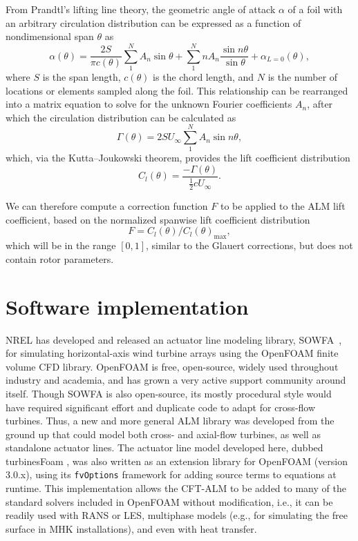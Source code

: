 \documentclass[times]{weauth}
\begin{document}
From Prandtl's lifting line theory, the geometric angle of attack $\alpha$ of a
foil with an arbitrary circulation distribution can be expressed as a function
of nondimensional span $\theta$ as \cite{Anderson2001}
\begin{equation}
    \alpha (\theta) = \frac{2S}{\pi c (\theta)}
    \sum_1^N A_n \sin \theta
    + \sum_1^N n A_n \frac{\sin n \theta}{\sin \theta}
    + \alpha_{L = 0}(\theta),
    \label{eq:lifting-line}
\end{equation}
where $S$ is the span length, $c(\theta)$ is the chord length, and $N$ is the
number of locations or elements sampled along the foil. This relationship can be
rearranged into a matrix equation to solve for the unknown Fourier coefficients
$A_n$, after which the circulation distribution can be calculated as
\begin{equation}
    \Gamma (\theta) = 2SU_\infty \sum_1^N A_n \sin n \theta,
\end{equation}
which, via the Kutta--Joukowski theorem, provides the lift coefficient
distribution
\begin{equation}
    C_l(\theta) = \frac{-\Gamma (\theta)}{\frac{1}{2} c U_\infty}.
\end{equation}

We can therefore compute a correction function $F$ to be applied to the ALM lift
coefficient, based on the normalized spanwise lift coefficient distribution
\begin{equation}
    F = C_l(\theta)/C_l(\theta)_{\max},
\end{equation}
which will be in the range $[0, 1]$, similar to the Glauert corrections, but
does not contain rotor parameters.


\section{Software implementation}

NREL has developed and released an actuator line modeling library,
SOWFA~\cite{Churchfield2014b}, for simulating horizontal-axis wind turbine
arrays using the OpenFOAM finite volume CFD library. OpenFOAM is free,
open-source, widely used throughout industry and academia, and has grown a very
active support community around itself. Though SOWFA is also open-source, its
mostly procedural style would have required significant effort and duplicate
code to adapt for cross-flow turbines. Thus, a new and more general ALM library
was developed from the ground up that could model both cross- and axial-flow
turbines, as well as standalone actuator lines. The actuator line model
developed here, dubbed turbinesFoam \cite{Bachant2016-turbinesFoam-v0.0.7}, was
also written as an extension library for OpenFOAM (version 3.0.x), using its
\texttt{fvOptions} framework for adding source terms to equations at runtime.
This implementation allows the CFT-ALM to be added to many of the standard
solvers included in OpenFOAM without modification, i.e., it can be readily used
with RANS or LES, multiphase models (e.g., for simulating the free surface in
MHK installations), and even with heat transfer.
\end{document}
